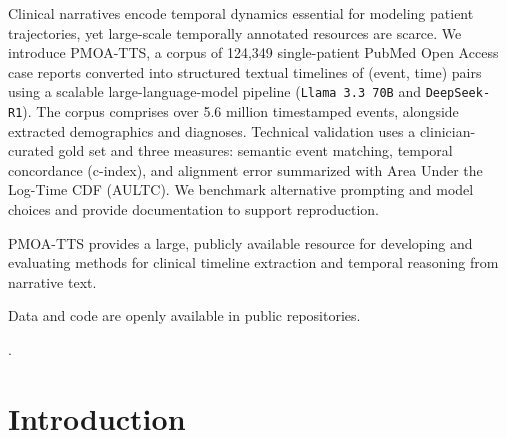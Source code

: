 \documentclass[pdflatex,sn-mathphys-num]{sn-jnl}%
\newif\ifshowrebuttalcolor
\newcommand{\rebuttal}[1]{%
  \ifshowrebuttalcolor
    \textcolor{rebuttalblue}{#1}%
  \else
    #1%
  \fi
}
\theoremstyle{thmstyleone}%
\theoremstyle{thmstyletwo}%
\theoremstyle{thmstylethree}%
\begin{document}
\abstract
{
Clinical narratives encode temporal dynamics essential for modeling patient trajectories, yet large-scale temporally annotated resources are scarce. We introduce PMOA-TTS, a corpus of 124{,}349 single-patient PubMed Open Access case reports converted into structured textual timelines of (event, time) pairs using a scalable large-language-model pipeline (\texttt{Llama 3.3 70B} and \texttt{DeepSeek-R1}). The corpus comprises over 5.6 million timestamped events, alongside extracted demographics and diagnoses. Technical validation uses a clinician-curated gold set and three measures: semantic event matching, temporal concordance (c-index), and alignment error summarized with Area Under the Log-Time CDF (AULTC). We benchmark alternative prompting and model choices and provide documentation to support reproduction. 
\rebuttal{
PMOA-TTS provides a large, publicly available resource for developing and evaluating methods for clinical timeline extraction and temporal reasoning from narrative text.
}
Data and code are openly available in public repositories.
}.


\maketitle


\section{Introduction}
\label{sec:introduction}
\end{document}

